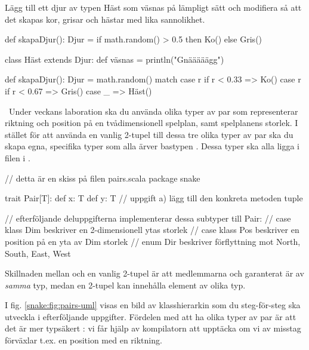 \Subtask Lägg till ett djur av typen Häst som väsnas på lämpligt sätt och modifiera  så att det skapas kor, grisar och hästar med lika sannolikhet.


\SOLUTION


\TaskSolved \what


\SubtaskSolved
\begin{Code}
def skapaDjur(): Djur = 
  if math.random() > 0.5 then Ko() else Gris()
\end{Code}

\SubtaskSolved
\begin{Code}
class Häst extends Djur: 
  def väsnas = println("Gnääääägg") 

def skapaDjur(): Djur = 
   math.random() match
    case r if r < 0.33 => Ko() 
    case r if r < 0.67 => Gris() 
    case _             => Häst()
\end{Code}


\QUESTEND







\QUESTBEGIN


\Task\label{exe:inheritance:labprep-pair}  \what~Under veckans laboration ska du använda olika typer av par som representerar riktning och position på en tvådimensionell spelplan, samt spelplanens storlek. I stället för att använda en vanlig 2-tupel till dessa tre olika typer av par ska du skapa egna, specifika  typer som alla ärver bastypen . Dessa typer ska alla ligga i filen  i .
\begin{Code}
// detta är en skiss på filen pairs.scala
package snake

trait Pair[T]:
  def x: T
  def y: T
  // uppgift a) lägg till den konkreta metoden tuple

// efterföljande deluppgifterna implementerar dessa subtyper till Pair:
//   case klass Dim beskriver en 2-dimensionell ytas storlek
//   case klass Pos beskriver en position på en yta av Dim storlek
//   enum Dir beskriver förflyttning mot North, South, East, West
\end{Code}
Skillnaden mellan  och en vanlig 2-tupel är att medlemmarna  och  garanterat är av \emph{samma} typ, medan en 2-tupel kan innehålla element av olika typ.

I fig. \ref{snake:fig:pairs-uml} visas en bild av klasshierarkin som du steg-för-steg ska utveckla i efterföljande  uppgifter. Fördelen med att ha olika typer av par är att det är mer typsäkert : vi får hjälp av kompilatorn att upptäcka om vi av misstag förväxlar t.ex. en position med en riktning.

